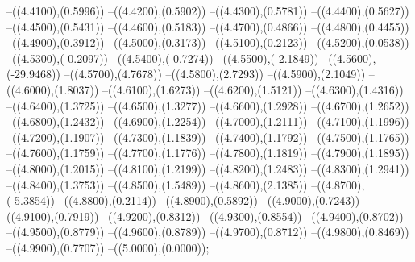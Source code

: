 {	--({\sx*(4.4100)},{\sy*(0.5996)})
	--({\sx*(4.4200)},{\sy*(0.5902)})
	--({\sx*(4.4300)},{\sy*(0.5781)})
	--({\sx*(4.4400)},{\sy*(0.5627)})
	--({\sx*(4.4500)},{\sy*(0.5431)})
	--({\sx*(4.4600)},{\sy*(0.5183)})
	--({\sx*(4.4700)},{\sy*(0.4866)})
	--({\sx*(4.4800)},{\sy*(0.4455)})
	--({\sx*(4.4900)},{\sy*(0.3912)})
	--({\sx*(4.5000)},{\sy*(0.3173)})
	--({\sx*(4.5100)},{\sy*(0.2123)})
	--({\sx*(4.5200)},{\sy*(0.0538)})
	--({\sx*(4.5300)},{\sy*(-0.2097)})
	--({\sx*(4.5400)},{\sy*(-0.7274)})
	--({\sx*(4.5500)},{\sy*(-2.1849)})
	--({\sx*(4.5600)},{\sy*(-29.9468)})
	--({\sx*(4.5700)},{\sy*(4.7678)})
	--({\sx*(4.5800)},{\sy*(2.7293)})
	--({\sx*(4.5900)},{\sy*(2.1049)})
	--({\sx*(4.6000)},{\sy*(1.8037)})
	--({\sx*(4.6100)},{\sy*(1.6273)})
	--({\sx*(4.6200)},{\sy*(1.5121)})
	--({\sx*(4.6300)},{\sy*(1.4316)})
	--({\sx*(4.6400)},{\sy*(1.3725)})
	--({\sx*(4.6500)},{\sy*(1.3277)})
	--({\sx*(4.6600)},{\sy*(1.2928)})
	--({\sx*(4.6700)},{\sy*(1.2652)})
	--({\sx*(4.6800)},{\sy*(1.2432)})
	--({\sx*(4.6900)},{\sy*(1.2254)})
	--({\sx*(4.7000)},{\sy*(1.2111)})
	--({\sx*(4.7100)},{\sy*(1.1996)})
	--({\sx*(4.7200)},{\sy*(1.1907)})
	--({\sx*(4.7300)},{\sy*(1.1839)})
	--({\sx*(4.7400)},{\sy*(1.1792)})
	--({\sx*(4.7500)},{\sy*(1.1765)})
	--({\sx*(4.7600)},{\sy*(1.1759)})
	--({\sx*(4.7700)},{\sy*(1.1776)})
	--({\sx*(4.7800)},{\sy*(1.1819)})
	--({\sx*(4.7900)},{\sy*(1.1895)})
	--({\sx*(4.8000)},{\sy*(1.2015)})
	--({\sx*(4.8100)},{\sy*(1.2199)})
	--({\sx*(4.8200)},{\sy*(1.2483)})
	--({\sx*(4.8300)},{\sy*(1.2941)})
	--({\sx*(4.8400)},{\sy*(1.3753)})
	--({\sx*(4.8500)},{\sy*(1.5489)})
	--({\sx*(4.8600)},{\sy*(2.1385)})
	--({\sx*(4.8700)},{\sy*(-5.3854)})
	--({\sx*(4.8800)},{\sy*(0.2114)})
	--({\sx*(4.8900)},{\sy*(0.5892)})
	--({\sx*(4.9000)},{\sy*(0.7243)})
	--({\sx*(4.9100)},{\sy*(0.7919)})
	--({\sx*(4.9200)},{\sy*(0.8312)})
	--({\sx*(4.9300)},{\sy*(0.8554)})
	--({\sx*(4.9400)},{\sy*(0.8702)})
	--({\sx*(4.9500)},{\sy*(0.8779)})
	--({\sx*(4.9600)},{\sy*(0.8789)})
	--({\sx*(4.9700)},{\sy*(0.8712)})
	--({\sx*(4.9800)},{\sy*(0.8469)})
	--({\sx*(4.9900)},{\sy*(0.7707)})
	--({\sx*(5.0000)},{\sy*(0.0000)});
}
